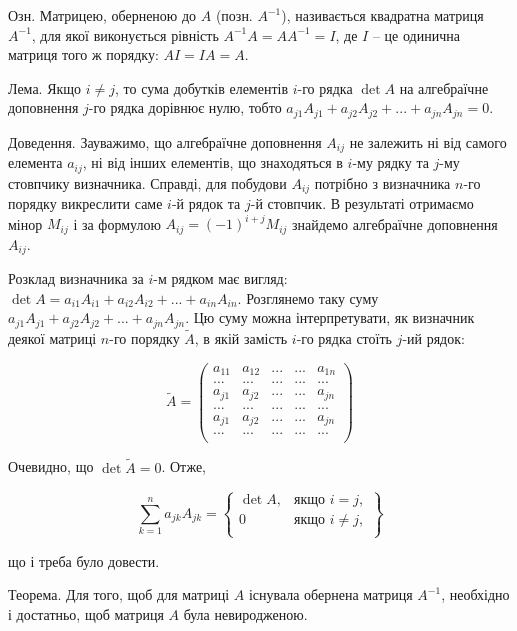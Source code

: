 Озн. Матрицею, оберненою до $A$ (позн. $A^{-1}$), називається квадратна матриця
$A^{-1}$, для якої виконується рівність $A^{-1} A = A A^{-1} = I$, де $I$ -- це одинична матриця
того ж порядку: $A I = I A = A$.


Лема. Якщо $i \neq j$, то сума добутків елементів $i$-го рядка $\det A$ на алгебраїчне
доповнення $j$-го рядка дорівнює нулю, тобто $a_{j1} A_{j1} + a_{j2} A_{j2} + ... + a_{jn} A_{jn} = 0$.


Доведення. Зауважимо, що алгебраїчне доповнення $A_{ij}$ не залежить ні від
самого елемента $a_{ij}$, ні від інших елементів, що знаходяться в $i$-му рядку та $j$-му
стовпчику визначника. Справді, для побудови $A_{ij}$ потрібно з визначника $n$-го
порядку викреслити саме $i$-й рядок та $j$-й стовпчик. В результаті отримаємо мінор
$M_{ij}$ і за формулою $A_{ij} = (-1)^{i+j}M_{ij}$ знайдемо алгебраїчне доповнення $A_{ij}$.


Розклад визначника за $i$-м рядком має вигляд: $\det A = a_{i1} A_{i1} + a_{i2} A_{i2} + ... + a_{in} A_{in}$.
Розглянемо таку суму $a_{j1} A_{j1} + a_{j2} A_{j2} + ... + a_{jn} A_{jn}$. Цю суму можна
інтерпретувати, як визначник деякої матриці $n$-го порядку $\tilde{A}$, в якій замість $i$-го
рядка стоїть $j$-ий рядок:

$$\tilde{A} = \begin{pmatrix}
	a_{11} & a_{12} & ... & ... & a_{1n} \\
	...    & ...    & ... & ... & ...    \\
	a_{j1} & a_{j2} & ... & ... & a_{jn} \\
	...    & ...    & ... & ... & ...    \\
	a_{j1} & a_{j2} & ... & ... & a_{jn} \\ 
	...    & ...    & ... & ... & ...    \\
\end{pmatrix}$$


Очевидно, що $\det \tilde{A} = 0$. Отже,

$$\sum\limits_{k=1}^n a_{jk} A_{jk} = \left\{ \begin{matrix}
	\det A, & \text{якщо } i = j,    \\
	0       & \text{якщо } i \neq j, \\
\end{matrix} \right\} $$

що і треба було довести.



Теорема. Для того, щоб для матриці $A$ існувала обернена матриця $A^{-1}$,
необхідно і достатньо, щоб матриця $A$ була невиродженою.


